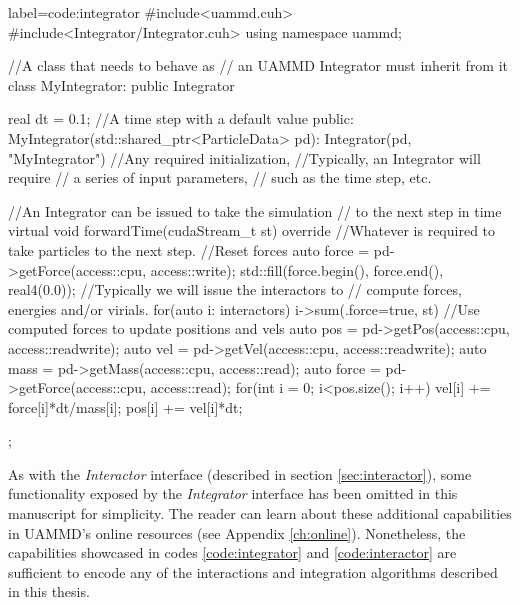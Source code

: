 \documentclass[ twoside,openright,titlepage,numbers=noenddot,%
headinclude,footinclude,cleardoublepage=empty,abstract=on,
BCOR=5mm,paper=b5,fontsize=11pt, dvipsnames
]{scrreprt}
\newcommand{\uammd}{\gls{UAMMD}\xspace}
\begin{document}
\begin{code2}
{label=code:integrator}
#include<uammd.cuh>
#include<Integrator/Integrator.cuh>
using namespace uammd;

//A class that needs to behave as 
// an UAMMD Integrator must inherit from it
class MyIntegrator: public Integrator{
  real dt = 0.1; //A time step with a default value
public:
  MyIntegrator(std::shared_ptr<ParticleData> pd):
          Integrator(pd, "MyIntegrator"){
    //Any required initialization,
    //Typically, an Integrator will require
    // a series of input parameters,
    // such as the time step, etc.
  }

  //An Integrator can be issued to take the simulation
  // to the next step in time
  virtual void forwardTime(cudaStream_t st) override{
   //Whatever is required to take particles to the next step.
   { //Reset forces
     auto force = pd->getForce(access::cpu, access::write);
     std::fill(force.begin(), force.end(), real4(0.0));
   }
   //Typically we will issue the interactors to 
   // compute forces, energies and/or virials.
   for(auto i: interactors) i->sum({.force=true}, st)
   //Use computed forces to update positions and vels
   auto pos = pd->getPos(access::cpu, access::readwrite);
   auto vel = pd->getVel(access::cpu, access::readwrite);
   auto mass = pd->getMass(access::cpu, access::read);
   auto force = pd->getForce(access::cpu, access::read);
   for(int i = 0; i<pos.size(); i++){
     vel[i] += force[i]*dt/mass[i];
     pos[i] += vel[i]*dt;
   }
  }
};
\end{code2}

As with the \emph{Interactor} interface (described in section \ref{sec:interactor}), some functionality exposed by the \emph{Integrator} interface has been omitted in this manuscript for simplicity. The reader can learn about these additional capabilities in \uammd's online resources (see Appendix \ref{ch:online}). Nonetheless, the capabilities showcased in codes \ref{code:integrator} and \ref{code:interactor} are sufficient to encode any of the interactions and integration algorithms described in this thesis.
\end{document}
